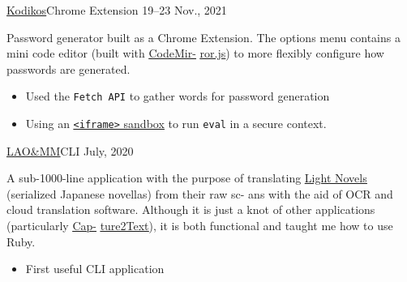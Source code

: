 \documentclass[10pt,a4paper,ragged2e,withhyper]{altacv}
\begin{document}
\begin{paracol}{2}
		\cvevent
		{\href{https://github.com/jaacko-torus/kodikos/}{\uline{Kodikos}}{\hr}Chrome Extension}
		{{\CVTagHTMLCSS}{\CVTagJavaScript}}
		{19--23 Nov., 2021}{}
		\vspace{-0.3cm}
		\begin{justify}
			Password generator built as a Chrome Extension. The options menu contains a mini code editor (built with \href{https://codemirror.net/}{\uline{CodeMir-}} \href{https://codemirror.net/}{\uline{ror.js}}) to more flexibly configure how passwords are generated.
		\end{justify}
		\vspace{-0.2cm}
		\smallskip
		\begin{itemize}
			\item Used the \texttt{Fetch API} to gather words for password generation
			\item Using an \href{https://developer.mozilla.org/en-US/docs/Web/HTTP/Headers/Content-Security-Policy/sandbox/}{\uline{\texttt{<iframe>} sandbox}} to run \texttt{eval} in a secure context.
		\end{itemize}
		
		\divider
		
		\cvevent
		{\href{https://github.com/jaacko-torus/lao-mm/}{\uline{LAO\&MM}}{\hr}CLI}
		{{\CVTagRuby}{\CVTagOCRA}}
		{July, 2020}{}
		\vspace{-0.3cm}
		\begin{justify}
			A sub-1000-line application with the purpose of translating \href{https://en.wikipedia.org/wiki/Light_novel}{\uline{Light Novels}} (serialized Japanese novellas) from their raw sc- ans with the aid of OCR and cloud translation software. Although it is just a knot of other applications (particularly \href{http://capture2text.sourceforge.net/}{\uline{Cap-}} \href{http://capture2text.sourceforge.net/}{\uline{ture2Text}}), it is both functional and taught me how to use Ruby.
		\end{justify}
		\vspace{-0.2cm}
		\smallskip
		\begin{itemize}
			\item First useful CLI application
		\end{itemize}
		
		\divider
		

\end{paracol}
\end{document}
